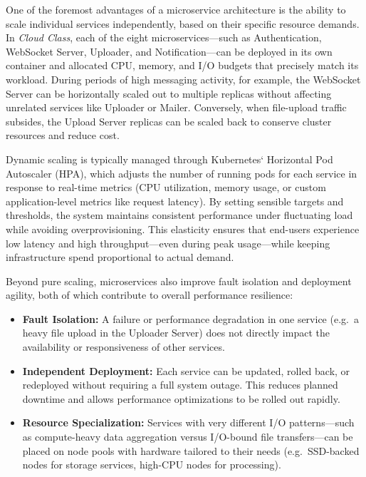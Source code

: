 One of the foremost advantages of a microservice architecture is the ability to scale individual services independently, based on their specific resource demands.  In \emph{Cloud Class}, each of the eight microservices—such as Authentication, WebSocket Server, Uploader, and Notification—can be deployed in its own container and allocated CPU, memory, and I/O budgets that precisely match its workload.  During periods of high messaging activity, for example, the WebSocket Server can be horizontally scaled out to multiple replicas without affecting unrelated services like Uploader or Mailer.  Conversely, when file-upload traffic subsides, the Upload Server replicas can be scaled back to conserve cluster resources and reduce cost.

Dynamic scaling is typically managed through Kubernetes` Horizontal Pod Autoscaler (HPA), which adjusts the number of running pods for each service in response to real-time metrics (CPU utilization, memory usage, or custom application-level metrics like request latency).  By setting sensible targets and thresholds, the system maintains consistent performance under fluctuating load while avoiding overprovisioning.  This elasticity ensures that end-users experience low latency and high throughput—even during peak usage—while keeping infrastructure spend proportional to actual demand.

Beyond pure scaling, microservices also improve fault isolation and deployment agility, both of which contribute to overall performance resilience:

\begin{itemize}
  \item \textbf{Fault Isolation:}  A failure or performance degradation in one service (e.g.\ a heavy file upload in the Uploader Server) does not directly impact the availability or responsiveness of other services.
  \item \textbf{Independent Deployment:}  Each service can be updated, rolled back, or redeployed without requiring a full system outage.  This reduces planned downtime and allows performance optimizations to be rolled out rapidly.
  \item \textbf{Resource Specialization:}  Services with very different I/O patterns—such as compute-heavy data aggregation versus I/O-bound file transfers—can be placed on node pools with hardware tailored to their needs (e.g.\ SSD-backed nodes for storage services, high-CPU nodes for processing).
\end{itemize}


